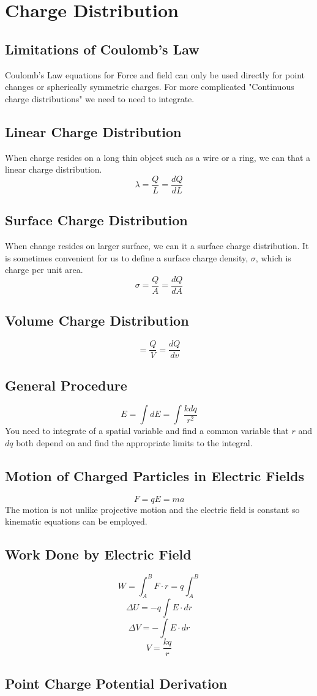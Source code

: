 \section{Charge Distribution}

\subsection{Limitations of Coulomb's Law}
Coulomb's Law equations for Force and field can only be used directly for point changes or spherically symmetric charges. For more complicated "Continuous charge distributions" we need to need to integrate. 

\subsection{Linear Charge Distribution}
When charge resides on a long thin object such as a wire or a ring, we can that a linear charge distribution.
\[\lambda =\frac{Q}{L} = \frac{dQ}{dL}\]

\subsection{Surface Charge Distribution}
When change resides on larger surface, we can it a surface charge distribution. It is sometimes convenient for us to define a surface charge density, $\sigma$, which is charge per unit area.
\[\sigma=\frac{Q}{A}=\frac{dQ}{dA}\]

\subsection{Volume Charge Distribution}
\[ = \frac{Q}{V} = \frac{dQ}{dv}\]

\subsection{General Procedure}
\[E=\int dE = \int \frac{kdq}{r^2}\]
You need to integrate of a spatial variable and find a common variable that $r$ and $dq$ both depend on and find the appropriate limits to the integral.

\subsection{Motion of Charged Particles in Electric Fields}
\[F=qE=ma\]
The motion is not unlike projective motion and the electric field is constant so kinematic equations can be employed.

\subsection{Work Done by Electric Field}
\[W=\int_A^BF\cdot r= q \int_A^B \]
\[\Delta U = -q\int E\cdot dr\]
\[\Delta V = -\int E \cdot dr\]
\[V=\frac{kq}{r}\]

\subsection{Point Charge Potential Derivation}